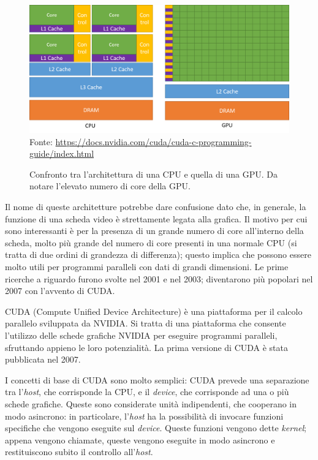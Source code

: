 \documentclass[12pt,a4paper,openright,twoside]{report}
\begin{document}
\begin{figure}[h]
    \centering
    \def\stackalignment{r}
    \stackunder
        {\includegraphics[width=\textwidth]{cpu-gpu-comparison.png}}
        {\scriptsize Fonte: \url{https://docs.nvidia.com/cuda/cuda-c-programming-guide/index.html}}
    \caption[Confronto tra CPU e GPU]{Confronto tra l'architettura di una CPU e quella di una GPU. Da notare l'elevato numero di core della GPU.}
    \label{img:cpu-gpu-comparison}
\end{figure}

Il nome di queste architetture potrebbe dare confusione dato che, in generale, la funzione di una scheda video è strettamente legata alla grafica. Il motivo per cui sono interessanti è per la presenza di un grande numero di core all'interno della scheda, molto più grande del numero di core presenti in una normale CPU (si tratta di due ordini di grandezza di differenza); questo implica che possono essere molto utili per programmi paralleli con dati di grandi dimensioni. Le prime ricerche a riguardo furono svolte nel 2001 e nel 2003; diventarono più popolari nel 2007 con l'avvento di CUDA.

CUDA (Compute Unified Device Architecture) è una piattaforma per il calcolo parallelo sviluppata da NVIDIA. Si tratta di una piattaforma che consente l'utilizzo delle schede grafiche NVIDIA per eseguire programmi paralleli, sfruttando appieno le loro potenzialità. La prima versione di CUDA è stata pubblicata nel 2007.

I concetti di base di CUDA sono molto semplici: CUDA prevede una separazione tra l'\textit{host}, che corrisponde la CPU, e il \textit{device}, che corrisponde ad una o più schede grafiche. Queste sono considerate unità indipendenti, che cooperano in modo asincrono: in particolare, l'\textit{host} ha la possibilità di invocare funzioni specifiche che vengono eseguite sul \textit{device}. Queste funzioni vengono dette \textit{kernel}; appena vengono chiamate, queste vengono eseguite in modo asincrono e restituiscono subito il controllo all'\textit{host}.
\end{document}
